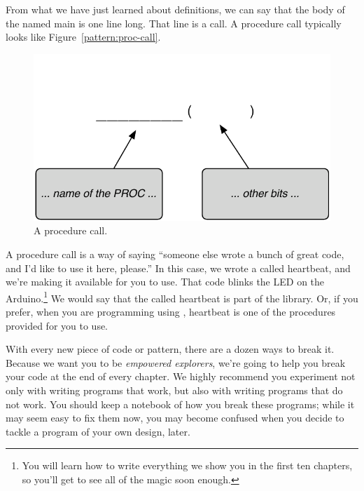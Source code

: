 

From what we have just learned about \PROC definitions, we can say that the body of the \PROC named {\code main} is one line long. That line is a \PROCedure call. A procedure call typically looks like Figure~\vref{pattern:proc-call}.

\begin{figure}[h!]
  \begin{center}
    \includegraphics[width=\linewidth]{images/ch1-proc-call-pattern}
    \caption{A procedure call.}
    \label{pattern:ch1-proc-call}
  \end{center}
\end{figure}

A procedure call is a way of saying ``someone else wrote a bunch of great code, and I'd like to use it here, please.'' In this case, we wrote a \PROC called {\code heartbeat}, and we're making it available for you to use. That code blinks the LED on the Arduino.\footnote{You will learn how to write everything we show you in the first ten chapters, so you'll get to see all of the magic soon enough.} We would say that the \PROC called {\code heartbeat} is part of the \plumbing library. Or, if you prefer, when you are programming using \plumbing, {\code heartbeat} is one of the procedures provided for you to use.

\BREAKAGE
With every new piece of code or pattern, there are a dozen ways to break it. Because we want you to be {\em empowered explorers}, we're going to help you break your code at the end of every chapter. We highly recommend you experiment not only with writing programs that work, but also with writing programs that {\strong do not} work. You should keep a notebook of how you break these programs; while it may seem easy to fix them now, you may become confused when you decide to tackle a program of your own design, later.

